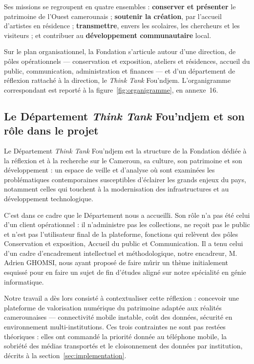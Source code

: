 Ses missions se regroupent en quatre ensembles : \textbf{conserver et présenter}
le patrimoine de l'Ouest camerounais ; \textbf{soutenir la création}, par
l'accueil d'artistes en résidence ; \textbf{transmettre}, envers les scolaires,
les chercheurs et les visiteurs ; et contribuer au \textbf{développement
communautaire} local.

Sur le plan organisationnel, la Fondation s'articule autour d'une direction, de
pôles opérationnels — conservation et exposition, ateliers et résidences,
accueil du public, communication, administration et finances — et d'un
département de réflexion rattaché à la direction, le \emph{Think Tank}
Fou'ndjem. L'organigramme correspondant est reporté à la
figure~\ref{fig:organigramme}, en annexe~16.


\subsection{Le Département \emph{Think Tank} Fou'ndjem et son rôle dans le projet}
\label{sec:thinktank}

Le Département \emph{Think Tank} Fou'ndjem est la structure de la Fondation
dédiée à la réflexion et à la recherche sur le Cameroun, sa culture, son
patrimoine et son développement : un espace de veille et d'analyse où sont
examinées les problématiques contemporaines susceptibles d'éclairer les grands
enjeux du pays, notamment celles qui touchent à la modernisation des
infrastructures et au développement technologique.

C'est dans ce cadre que le Département nous a accueilli. Son rôle n'a pas été
celui d'un client opérationnel : il n'administre pas les collections, ne reçoit
pas le public et n'est pas l'utilisateur final de la plateforme, fonctions qui
relèvent des pôles Conservation et exposition, Accueil du public et
Communication. Il a tenu celui d'un cadre d'encadrement intellectuel et
méthodologique, notre encadreur, M. Adrien GHOMSI, nous ayant proposé de faire
mûrir un thème initialement esquissé pour en faire un sujet de fin d'études
aligné sur notre spécialité en génie informatique.

Notre travail a dès lors consisté à contextualiser cette réflexion : concevoir
une plateforme de valorisation numérique du patrimoine adaptée aux réalités
camerounaises — connectivité mobile instable, coût des données, sécurité en
environnement multi-institutions. Ces trois contraintes ne sont pas restées
théoriques : elles ont commandé la priorité donnée au téléphone mobile, la
sobriété des médias transportés et le cloisonnement des données par
institution, décrits à la section~\ref{sec:implementation}.

